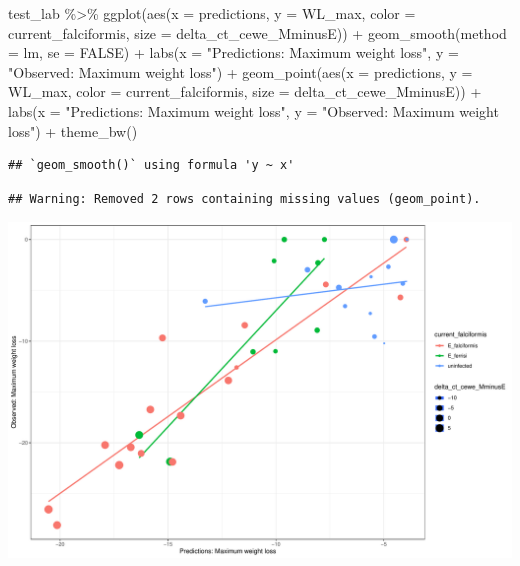 \documentclass[
]{article}
\newenvironment{Shaded}{\begin{snugshade}}{\end{snugshade}}
\newcommand{\AttributeTok}[1]{\textcolor[rgb]{0.77,0.63,0.00}{#1}}
\newcommand{\ConstantTok}[1]{\textcolor[rgb]{0.00,0.00,0.00}{#1}}
\newcommand{\FunctionTok}[1]{\textcolor[rgb]{0.00,0.00,0.00}{#1}}
\newcommand{\NormalTok}[1]{#1}
\newcommand{\SpecialCharTok}[1]{\textcolor[rgb]{0.00,0.00,0.00}{#1}}
\newcommand{\StringTok}[1]{\textcolor[rgb]{0.31,0.60,0.02}{#1}}
\begin{document}
\begin{Shaded}
\begin{Highlighting}[]
\NormalTok{test\_lab   }\SpecialCharTok{\%\textgreater{}\%}
  \FunctionTok{ggplot}\NormalTok{(}\FunctionTok{aes}\NormalTok{(}\AttributeTok{x =}\NormalTok{ predictions, }\AttributeTok{y =}\NormalTok{ WL\_max, }\AttributeTok{color =}\NormalTok{ current\_falciformis, }
                 \AttributeTok{size =}\NormalTok{ delta\_ct\_cewe\_MminusE)) }\SpecialCharTok{+}
  \FunctionTok{geom\_smooth}\NormalTok{(}\AttributeTok{method =}\NormalTok{ lm, }\AttributeTok{se =} \ConstantTok{FALSE}\NormalTok{) }\SpecialCharTok{+}
  \FunctionTok{labs}\NormalTok{(}\AttributeTok{x =} \StringTok{"Predictions: Maximum weight loss"}\NormalTok{, }
       \AttributeTok{y =} \StringTok{"Observed: Maximum weight loss"}\NormalTok{) }\SpecialCharTok{+}
  \FunctionTok{geom\_point}\NormalTok{(}\FunctionTok{aes}\NormalTok{(}\AttributeTok{x =}\NormalTok{ predictions, }\AttributeTok{y =}\NormalTok{ WL\_max, }
                 \AttributeTok{color =}\NormalTok{ current\_falciformis, }\AttributeTok{size =}\NormalTok{ delta\_ct\_cewe\_MminusE)) }\SpecialCharTok{+}
  \FunctionTok{labs}\NormalTok{(}\AttributeTok{x =} \StringTok{"Predictions: Maximum weight loss"}\NormalTok{, }
       \AttributeTok{y =} \StringTok{"Observed: Maximum weight loss"}\NormalTok{) }\SpecialCharTok{+}
    \FunctionTok{theme\_bw}\NormalTok{()}
\end{Highlighting}
\end{Shaded}

\begin{verbatim}
## `geom_smooth()` using formula 'y ~ x'
\end{verbatim}

\begin{verbatim}
## Warning: Removed 2 rows containing missing values (geom_point).
\end{verbatim}

\includegraphics{8.Random_Forest_lab_gene_files/figure-latex/unnamed-chunk-10-1.pdf}
\end{document}
